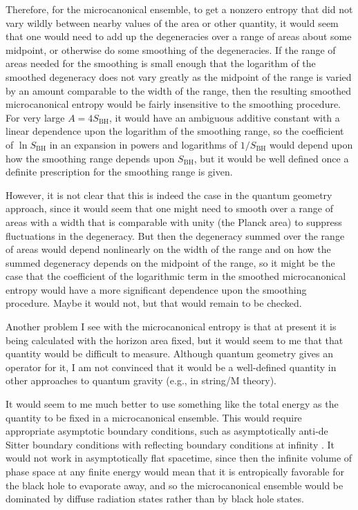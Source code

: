 \documentclass[12pt]{article} \usepackage{latexsym}
\begin{document}
Therefore, for the microcanonical ensemble, to get a nonzero entropy
that did not vary wildly between nearby values of the area or other
quantity, it would seem that one would need to add up the degeneracies
over a range of areas about some midpoint, or otherwise do some
smoothing of the degeneracies.  If the range of areas needed for the
smoothing is small enough that the logarithm of the smoothed degeneracy
does not vary greatly as the midpoint of the range is varied by an
amount comparable to the width of the range, then the resulting
smoothed microcanonical entropy would be fairly insensitive to the
smoothing procedure.  For very large $A = 4S_{\mathrm{BH}}$, it would
have an ambiguous additive constant with a linear dependence upon the
logarithm of the smoothing range, so the coefficient of
$\ln{S_{\mathrm{BH}}}$ in an expansion in powers and logarithms of
$1/S_{\mathrm{BH}}$ would depend upon how the smoothing range depends
upon $S_{\mathrm{BH}}$, but it would be well defined once a definite
prescription for the smoothing range is given.

However, it is not clear that this is indeed the case in the quantum
geometry approach, since it would seem that one might need to smooth
over a range of areas with a width that is comparable with unity (the
Planck area) to suppress fluctuations in the degeneracy.  But then the
degeneracy summed over the range of areas would depend nonlinearly on
the width of the range and on how the summed degeneracy depends on the
midpoint of the range, so it might be the case that the coefficient of
the logarithmic term in the smoothed microcanonical entropy would have
a more significant dependence upon the smoothing procedure.  Maybe it
would not, but that would remain to be checked.

Another problem I see with the microcanonical entropy is that at present
it is being calculated with the horizon area fixed, but it would seem to
me that that quantity would be difficult to measure.  Although quantum
geometry gives an operator for it, I am not convinced that it would be a
well-defined quantity in other approaches to quantum gravity (e.g., in
string/M theory).

It would seem to me much better to use something like the total energy
as the quantity to be fixed in a microcanonical ensemble.  This would
require appropriate asymptotic boundary conditions, such as
asymptotically anti-de Sitter boundary conditions with reflecting
boundary conditions at infinity \cite{HawPage}.  It would not work in
asymptotically flat spacetime, since then the infinite volume of phase
space at any finite energy would mean that it is entropically favorable
for the black hole to evaporate away, and so the microcanonical
ensemble would be dominated by diffuse radiation states rather than by
black hole states.
\end{document}
